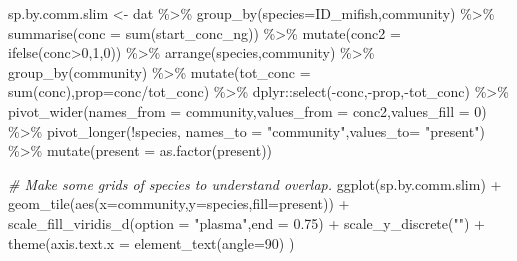 \documentclass[
]{article}
\newenvironment{Shaded}{\begin{snugshade}}{\end{snugshade}}
\newcommand{\AttributeTok}[1]{\textcolor[rgb]{0.77,0.63,0.00}{#1}}
\newcommand{\CommentTok}[1]{\textcolor[rgb]{0.56,0.35,0.01}{\textit{#1}}}
\newcommand{\DecValTok}[1]{\textcolor[rgb]{0.00,0.00,0.81}{#1}}
\newcommand{\FloatTok}[1]{\textcolor[rgb]{0.00,0.00,0.81}{#1}}
\newcommand{\FunctionTok}[1]{\textcolor[rgb]{0.00,0.00,0.00}{#1}}
\newcommand{\NormalTok}[1]{#1}
\newcommand{\OtherTok}[1]{\textcolor[rgb]{0.56,0.35,0.01}{#1}}
\newcommand{\SpecialCharTok}[1]{\textcolor[rgb]{0.00,0.00,0.00}{#1}}
\newcommand{\StringTok}[1]{\textcolor[rgb]{0.31,0.60,0.02}{#1}}
\begin{document}
\begin{Shaded}
\begin{Highlighting}[]
\NormalTok{sp.by.comm.slim }\OtherTok{\textless{}{-}}\NormalTok{  dat }\SpecialCharTok{\%\textgreater{}\%}
  \FunctionTok{group\_by}\NormalTok{(}\AttributeTok{species=}\NormalTok{ID\_mifish,community) }\SpecialCharTok{\%\textgreater{}\%}
  \FunctionTok{summarise}\NormalTok{(}\AttributeTok{conc =} \FunctionTok{sum}\NormalTok{(start\_conc\_ng)) }\SpecialCharTok{\%\textgreater{}\%}
  \FunctionTok{mutate}\NormalTok{(}\AttributeTok{conc2 =} \FunctionTok{ifelse}\NormalTok{(conc}\SpecialCharTok{\textgreater{}}\DecValTok{0}\NormalTok{,}\DecValTok{1}\NormalTok{,}\DecValTok{0}\NormalTok{)) }\SpecialCharTok{\%\textgreater{}\%}
  \FunctionTok{arrange}\NormalTok{(species,community) }\SpecialCharTok{\%\textgreater{}\%} \FunctionTok{group\_by}\NormalTok{(community) }\SpecialCharTok{\%\textgreater{}\%}
  \FunctionTok{mutate}\NormalTok{(}\AttributeTok{tot\_conc =} \FunctionTok{sum}\NormalTok{(conc),}\AttributeTok{prop=}\NormalTok{conc}\SpecialCharTok{/}\NormalTok{tot\_conc) }\SpecialCharTok{\%\textgreater{}\%}
\NormalTok{  dplyr}\SpecialCharTok{::}\FunctionTok{select}\NormalTok{(}\SpecialCharTok{{-}}\NormalTok{conc,}\SpecialCharTok{{-}}\NormalTok{prop,}\SpecialCharTok{{-}}\NormalTok{tot\_conc) }\SpecialCharTok{\%\textgreater{}\%}
  \FunctionTok{pivot\_wider}\NormalTok{(}\AttributeTok{names\_from =}\NormalTok{ community,}\AttributeTok{values\_from =}\NormalTok{ conc2,}\AttributeTok{values\_fill =} \DecValTok{0}\NormalTok{) }\SpecialCharTok{\%\textgreater{}\%}
  \FunctionTok{pivot\_longer}\NormalTok{(}\SpecialCharTok{!}\NormalTok{species, }\AttributeTok{names\_to =} \StringTok{"community"}\NormalTok{,}\AttributeTok{values\_to=} \StringTok{"present"}\NormalTok{) }\SpecialCharTok{\%\textgreater{}\%} 
  \FunctionTok{mutate}\NormalTok{(}\AttributeTok{present =} \FunctionTok{as.factor}\NormalTok{(present))}

\CommentTok{\# Make some grids of species to understand overlap.}
\FunctionTok{ggplot}\NormalTok{(sp.by.comm.slim) }\SpecialCharTok{+}
  \FunctionTok{geom\_tile}\NormalTok{(}\FunctionTok{aes}\NormalTok{(}\AttributeTok{x=}\NormalTok{community,}\AttributeTok{y=}\NormalTok{species,}\AttributeTok{fill=}\NormalTok{present)) }\SpecialCharTok{+}
  \FunctionTok{scale\_fill\_viridis\_d}\NormalTok{(}\AttributeTok{option =} \StringTok{"plasma"}\NormalTok{,}\AttributeTok{end =} \FloatTok{0.75}\NormalTok{) }\SpecialCharTok{+}
  \FunctionTok{scale\_y\_discrete}\NormalTok{(}\StringTok{""}\NormalTok{) }\SpecialCharTok{+}
  \FunctionTok{theme}\NormalTok{(}\AttributeTok{axis.text.x =} \FunctionTok{element\_text}\NormalTok{(}\AttributeTok{angle=}\DecValTok{90}\NormalTok{) ) }
\end{Highlighting}
\end{Shaded}
\end{document}
